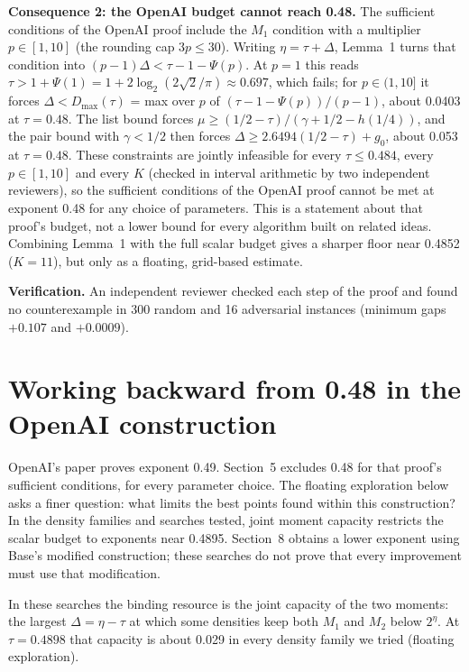 \documentclass[11pt]{article}
\theoremstyle{plain}
\begin{document}
\textbf{Consequence 2: the OpenAI budget cannot reach 0.48.} The sufficient conditions of the OpenAI proof include the $M_1$ condition with a multiplier $p \in [1, 10]$ (the rounding cap $3p \le 30$). Writing $\eta = \tau + \Delta$, Lemma~1 turns that condition into $(p - 1)\Delta < \tau - 1 - \Psi(p)$. At $p = 1$ this reads $\tau > 1 + \Psi(1) = 1 + 2\log_2(2\sqrt2/\pi) \approx 0.697$, which fails; for $p \in (1, 10]$ it forces $\Delta < D_{\max}(\tau)$ = max over $p$ of $(\tau - 1 - \Psi(p))/(p - 1)$, about 0.0403 at $\tau = 0.48$. The list bound forces $\mu \ge (1/2 - \tau)/(\gamma + 1/2 - h(1/4))$, and the pair bound with $\gamma < 1/2$ then forces $\Delta \ge 2.6494(1/2 - \tau) + g_0$, about 0.053 at $\tau = 0.48$. These constraints are jointly infeasible for every $\tau \le 0.484$, every $p \in [1, 10]$ and every $K$ (checked in interval arithmetic by two independent reviewers), so the sufficient conditions of the OpenAI proof cannot be met at exponent 0.48 for any choice of parameters. This is a statement about that proof's budget, not a lower bound for every algorithm built on related ideas. Combining Lemma~1 with the full scalar budget gives a sharper floor near 0.4852 ($K = 11$), but only as a floating, grid-based estimate.

\textbf{Verification.} An independent reviewer checked each step of the proof and found no counterexample in 300 random and 16 adversarial instances (minimum gaps $+0.107$ and $+0.0009$).

\section{Working backward from 0.48 in the OpenAI construction}

OpenAI's paper proves exponent 0.49. Section~5 excludes 0.48 for that proof's sufficient conditions, for every parameter choice. The floating exploration below asks a finer question: what limits the best points found within this construction? In the density families and searches tested, joint moment capacity restricts the scalar budget to exponents near 0.4895. Section~8 obtains a lower exponent using Base's modified construction; these searches do not prove that every improvement must use that modification.

In these searches the binding resource is the joint capacity of the two moments: the largest $\Delta = \eta - \tau$ at which some densities keep both $M_1$ and $M_2$ below $2^\eta$. At $\tau = 0.4898$ that capacity is about 0.029 in every density family we tried (floating exploration).
\end{document}
